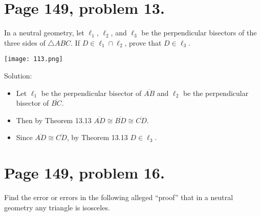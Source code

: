 \documentclass[12pt,openany]{report}
\begin{document}
\newpage

\section*{Page 149, problem 13.}

In a neutral geometry, let $\ell_1$, $\ell_2$, and $\ell_3$ be the perpendicular
bisectors of the three sides of $\triangle ABC$.
If $D\in\ell_1\cap\ell_2$, prove that $D\in\ell_3$.

\texttt{[image: 113.png]}

\noindent
Solution:

\begin{itemize}

\item[]
Let $\ell_1$ be the perpendicular bisector of $\overline{AB}$
and $\ell_2$ be the perpendicular bisector of $\overline{BC}$.

\item[]
Then by Theorem 13.13 $\overline{AD}\cong\overline{BD}\cong\overline{CD}$.

\item[]
Since $\overline{AD}\cong\overline{CD}$, by Theorem 13.13
$D\in\ell_3$.

\end{itemize}

\newpage

\section*{Page 149, problem 16.}

Find the error or errors in the following alleged ``proof'' that in a neutral geometry
any triangle is isosceles.
\end{document}
